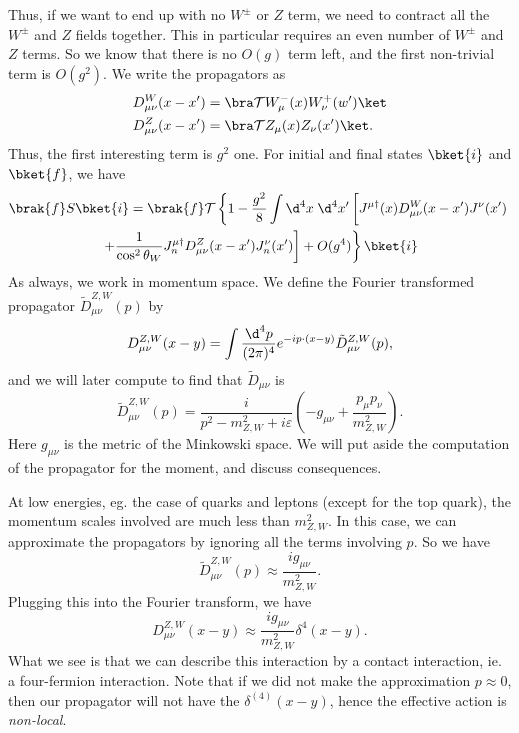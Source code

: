 \documentclass[a4paper]{article}
\begin{document}
Thus, if we want to end up with no $W^{\pm}$ or $Z$ term, we need to contract all the $W^{\pm}$ and $Z$ fields together. This in particular requires an even number of $W^{\pm}$ and $Z$ terms. So we know that there is no $O(g)$ term left, and the first non-trivial term is $O(g^2)$. We write the propagators as
\begin{align*}
  D_{\mu\nu}^W (x - x') &= \bra \mathcal{T} W_\mu^-(x) W_\nu^+(w')\ket\\
  D_{\mu\nu}^Z (x - x') &= \bra \mathcal{T} Z_\mu(x) Z_\nu(x') \ket.
\end{align*}
Thus, the first interesting term is $g^2$ one. For initial and final states $\bket{i}$ and $\bket{f}$, we have
\begin{multline*}
  \brak{f}S\bket{i} = \brak{f} \mathcal{T} \left\{ 1 - \frac{g^2}{8} \int \d^4 x\; \d^4 x'\left[J^{\mu\dagger}(x) D_{\mu\nu}^W (x - x') J^\nu(x') \vphantom{\frac{1}{\cos^2 \theta_W}}\right.\right. \\
  \left.\left.+ \frac{1}{\cos^2 \theta_W} J_n^{\mu\dagger} D_{\mu\nu}^Z (x - x') J_n^\nu(x')\right] + O(g^4)\right\}\bket{i}
\end{multline*}
As always, we work in momentum space. We define the Fourier transformed propagator $\tilde{D}_{\mu\nu}^{Z, W}(p)$ by
\[
  D_{\mu\nu}^{Z, W} (x - y) = \int \frac{\d^4 p}{(2\pi)^4} e^{-ip\cdot (x - y)} \tilde{D}_{\mu\nu}^{Z, W}(p),
\]
and we will later compute to find that $\tilde{D}_{\mu\nu}$ is
\[
  \tilde{D}_{\mu\nu}^{Z, W} (p) = \frac{i}{p^2 - m_{Z, W}^2 + i \varepsilon}\left(-g_{\mu\nu} + \frac{p_\mu p_\nu}{m^2_{Z, W}}\right).
\]
Here $g_{\mu\nu}$ is the metric of the Minkowski space. We will put aside the computation of the propagator for the moment, and discuss consequences.

At low energies, eg. the case of quarks and leptons (except for the top quark), the momentum scales involved are much less than $m^2_{Z, W}$. In this case, we can approximate the propagators by ignoring all the terms involving $p$. So we have
\[
  \tilde{D}^{Z, W}_{\mu\nu}(p) \approx \frac{i g_{\mu\nu}}{m_{Z, W}^2}.
\]
Plugging this into the Fourier transform, we have
\[
  D_{\mu\nu}^{Z, W}(x - y) \approx \frac{ig_{\mu\nu}}{m^2_{Z, W}} \delta^4(x - y).
\]
What we see is that we can describe this interaction by a contact interaction, ie. a four-fermion interaction. Note that if we did not make the approximation $p \approx 0$, then our propagator will not have the $\delta^{(4)}(x - y)$, hence the effective action is \emph{non-local}.
\end{document}
